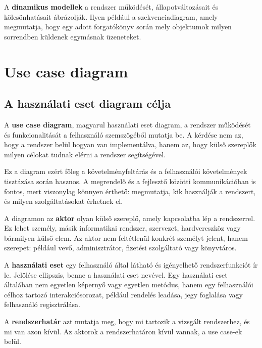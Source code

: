 A \textbf{dinamikus modellek} a rendszer működését, állapotváltozásait és kölcsönhatásait ábrázolják. Ilyen például a szekvenciadiagram, amely megmutatja, hogy egy adott forgatókönyv során mely objektumok milyen sorrendben küldenek egymásnak üzeneteket.

\section{Use case diagram}

\subsection{A használati eset diagram célja}

A \textbf{use case diagram}, magyarul használati eset diagram, a rendszer működését és funkcionalitását a felhasználó szemszögéből mutatja be. A kérdése nem az, hogy a rendszer belül hogyan van implementálva, hanem az, hogy külső szereplők milyen célokat tudnak elérni a rendszer segítségével.

Ez a diagram ezért főleg a követelményfeltárás és a felhasználói követelmények tisztázása során hasznos. A megrendelő és a fejlesztő közötti kommunikációban is fontos, mert viszonylag könnyen érthető: megmutatja, kik használják a rendszert, és milyen szolgáltatásokat érhetnek el.

\begin{center}

\end{center}



A diagramon az \textbf{aktor} olyan külső szereplő, amely kapcsolatba lép a rendszerrel. Ez lehet személy, másik informatikai rendszer, szervezet, hardvereszköz vagy bármilyen külső elem. Az aktor nem feltétlenül konkrét személyt jelent, hanem szerepet: például vevő, adminisztrátor, fizetési szolgáltató vagy könyvtáros.

A \textbf{használati eset} egy felhasználó által látható és igényelhető rendszerfunkciót ír le. Jelölése ellipszis, benne a használati eset nevével. Egy használati eset általában nem egyetlen képernyő vagy egyetlen metódus, hanem egy felhasználói célhoz tartozó interakciósorozat, például rendelés leadása, jegy foglalása vagy felhasználó regisztrálása.

A \textbf{rendszerhatár} azt mutatja meg, hogy mi tartozik a vizsgált rendszerhez, és mi van azon kívül. Az aktorok a rendszerhatáron kívül vannak, a use case-ek belül.

